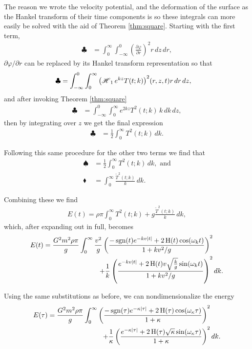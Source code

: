 The reason we wrote the velocity potential, and the deformation of the surface as the Hankel transform of their time components is so these integrals can more easily be solved with the aid of Theorem \ref{thm:square}. Starting with the first term,
\begin{align*}
\clubsuit &= \int_0^\infty \int_{-\infty}^0 \left( \frac{\partial \varphi}{\partial r} \right)^2 r \, dz \, dr,
\end{align*}
$\partial \varphi / \partial r$ can be replaced by its Hankel transform representation so that
\begin{align*}
\clubsuit &= \int_{-\infty}^0 \int_0^\infty \Hank[1]{e^{kz}T(t;k)}^2(r,z,t) r \, dr \, dz,
\end{align*}
and after invoking Theorem \ref{thm:square}
\begin{align*}
\clubsuit &= \int_{-\infty}^0 \int_0^\infty e^{2kz} T^2(t;k) \, k \, dk \, dz,
\end{align*}
then by integrating over $z$ we get the final expression
\begin{align*}
\clubsuit &= \frac{1}{2} \int_0^\infty T^2(t;k) \, dk.
\end{align*}

Following this same procedure for the other two terms we find that
\begin{align*}
\spadesuit &= \frac{1}{2} \int_0^\infty T^2(t;k) \, dk, \text{ and} \\
\blacklozenge &= \int_0^\infty \frac{\widetilde{T}^2(t;k)}{k} \, dk.
\end{align*}

Combining these we find
\begin{align*}
E(t) = \rho \pi \int_0^\infty T^2(t;k) + g \frac{\widetilde{T}^2(t;k)}{k} \, dk,
\end{align*}
which, after expanding out in full, becomes
\begin{equation*}
\begin{split}
E(t) = \frac{G^2 m^2 \rho \pi}{g} \int_0^\infty \frac{v^2}{g} \left( \frac{- \sgn(t) e^{-kv |t|} + 2 \Heavi(t) \cos(\omega_k t)}{1+kv^2/g} \right)^2& \\
+ \frac{1}{k} \left( \frac{e^{-kv |t|} + 2 \Heavi(t) v \sqrt{\frac{k}{g}} \sin(\omega_k t)}{1+kv^2/g} \right)^2& \, dk.
\end{split}
\end{equation*}

Using the same substitutions as before, we can nondimensionalize the energy
\begin{equation}
\label{eq:fullenergynon}
\begin{split}
E(\tau) = \frac{G^2 m^2 \rho \pi}{g} \int_0^\infty \left( \frac{- \sgn(\tau) e^{-\kappa |\tau|} + 2 \Heavi(\tau) \cos(\omega_\kappa \tau)}{1+\kappa} \right)^2& \\
+ \frac{1}{\kappa} \left( \frac{e^{-\kappa |\tau|} + 2 \Heavi(\tau) \sqrt{\kappa} \sin(\omega_\kappa \tau)}{1+\kappa} \right)^2& \, dk.
\end{split}
\end{equation}

